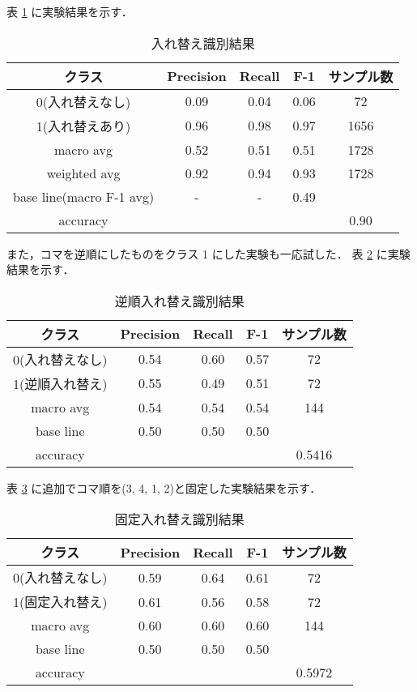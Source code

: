 \documentclass[onecolumn]{ujarticle}   %
\begin{document}
	表 \ref{tab:result1} に実験結果を示す．
	\begin{table}[h]
		\vspace{1mm}
		\centering
		\caption{入れ替え識別結果}
		\vspace{-3mm}
		\label{tab:result1}
		\begin{tabular}{|c|c|c|c|c|} \hline
	    クラス&Precision&Recall&F-1&サンプル数\\ \hline\hline
	   	0(入れ替えなし)&0.09&0.04&0.06&72\\ \hline
	   	1(入れ替えあり)&0.96&0.98&0.97&1656\\ \hline
			macro avg&0.52&0.51&0.51&1728\\ \hline
			weighted avg&0.92&0.94&0.93&1728\\ \hline
			base line(macro F-1 avg)&-&-&0.49&\\ \hline
			accuracy&&&&0.90\\ \hline
		\end{tabular}
	\end{table}

	また，コマを逆順にしたものをクラス 1 にした実験も一応試した．
	表 \ref{tab:result2} に実験結果を示す．
	\begin{table}[h]
		\vspace{1mm}
		\centering
		\caption{逆順入れ替え識別結果}
		\vspace{-3mm}
		\label{tab:result2}
		\begin{tabular}{|c|c|c|c|c|} \hline
	    クラス&Precision&Recall&F-1&サンプル数\\ \hline\hline
	   	0(入れ替えなし)&0.54&0.60&0.57&72\\ \hline
	   	1(逆順入れ替え)&0.55&0.49&0.51&72\\ \hline
			macro avg&0.54&0.54&0.54&144\\ \hline
			base line&0.50&0.50&0.50&\\ \hline
			accuracy&&&&0.5416\\ \hline
		\end{tabular}
	\end{table}

	表 \ref{tab:result3} に追加でコマ順を(3, 4, 1, 2)と固定した実験結果を示す．
	\begin{table}[h]
		\vspace{1mm}
		\centering
		\caption{固定入れ替え識別結果}
		\vspace{-3mm}
		\label{tab:result3}
		\begin{tabular}{|c|c|c|c|c|} \hline
			クラス&Precision&Recall&F-1&サンプル数\\ \hline\hline
			0(入れ替えなし)&0.59&0.64&0.61&72\\ \hline
			1(固定入れ替え)&0.61&0.56&0.58&72\\ \hline
			macro avg&0.60&0.60&0.60&144\\ \hline
			base line&0.50&0.50&0.50&\\ \hline
			accuracy&&&&0.5972\\ \hline
		\end{tabular}
	\end{table}
\end{document}
